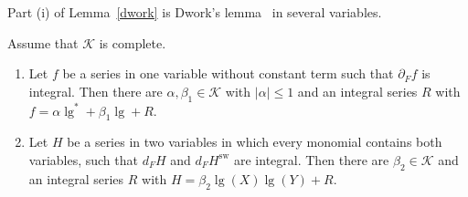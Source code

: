 Part (i) of Lemma~\ref{dwork} is Dwork's lemma~\cite[Chapter~IV]{koblitz} in several variables.

\begin{lemma}\label{cob}
Assume that $\mathcal K$ is complete.
\begin{enumerate}
\item[(i)] Let $f$ be a series in one variable without constant term such that $\partial_Ff$ is integral. Then there are $\alpha,\beta_1\in\mathcal K$ with $\lvert\alpha\rvert\le1$ and an integral series $R$ with $f=\alpha\operatorname{lg}^\ast+\beta_1\operatorname{lg}+R$.
\item[(ii)] Let $H$ be a series in two variables in which every monomial contains both variables, such that $d_FH$ and $d_FH^{\mathrm{sw}}$ are integral. Then there are $\beta_2\in\mathcal K$ and an integral series $R$ with $H=\beta_2\operatorname{lg}(X)\operatorname{lg}(Y)+R$.
\end{enumerate}
\end{lemma}

